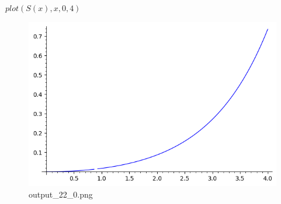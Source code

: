 \documentclass[11pt]{article}
\begin{document}


$plot(S(x), x, 0, 4)$
 
            
    

\begin{figure}
\centering
\includegraphics{output_22_0.png}
\caption{output\_22\_0.png}
\end{figure}
\end{document}
